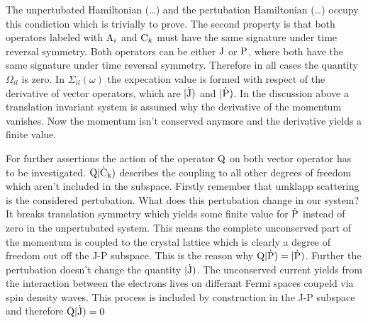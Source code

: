 The unpertubated Hamiltonian (\dots{}) and the pertubation Hamiltonian (\dots{}) occupy this condiction which is trivially to prove.
The second property is that both operators labeled with $\mathrm{A}_{i}$ and $\mathrm{C}_{k}$ must have the same signature under time reversal symmetry.
Both operators can be either $\mathrm{J}$ or $\mathrm{P}$, where both have the same signature under time reversal symmetry.
Therefore in all cases the quantity $\Omega_{il}$ is zero.
In $\Sigma_{il}(\omega)$ the expecation value is formed with respect of the derivative of vector operators, which are $|\mathrm{\dot{\mathrm{J}}})$ and $|\mathrm{\dot{\mathrm{P}}})$.
In the discussion above a translation invariant system is assumed why the derivative of the momentum vanishes.
Now the momentum isn't conserved anymore and the derivative yields a finite value.

For further assertions the action of the operator $\mathrm{Q}$ on both vector operator has to be investigated.
$\mathrm{Q} |\mathrm{\dot{\mathrm{C}}_{k}})$ describes the coupling to all other degrees of freedom which aren't included in the subspace.
Firstly remember that umklapp scattering is the considered pertubation.
What does this pertubation change in our system?
It breaks translation symmetry which yields some finite value for $\dot{\mathrm{P}}$ instead of zero in the unpertubated system.
This means the complete unconserved part of the momentum is coupled to the crystal lattice which is clearly a degree of freedom out off the J-P subspace.
This is the reason why $\mathrm{Q} |\mathrm{\dot{\mathrm{P}}}) = |\mathrm{\dot{\mathrm{P}}})$.
Further the pertubation doesn't change the quantity $|\mathrm{\dot{\mathrm{J}}})$.
The unconserved current yields from the interaction between the electrons lives on differant Fermi spaces coupeld via spin density waves.
This process is included by construction in the J-P subspace and therefore $\mathrm{Q} |\mathrm{\dot{\mathrm{J}}}) = 0$

